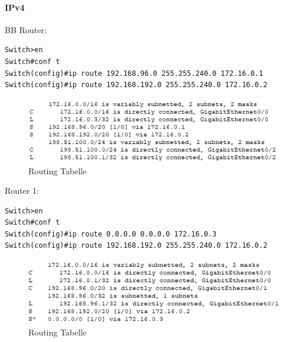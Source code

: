 \paragraph{IPv4}
BB Router:
\begin{lstlisting}
Switch>en
Switch#conf t
Switch(config)#ip route 192.168.96.0 255.255.240.0 172.16.0.1
Switch(config)#ip route 192.168.192.0 255.255.240.0 172.16.0.2 
\end{lstlisting}
\begin{figure}[!htb]
    \centering
    \includegraphics[width=\textwidth,height=.75\textwidth,keepaspectratio]{./routing/ipv4_bb.png}
    \caption{Routing Tabelle}
\end{figure}

\noindent
Router 1:
\begin{lstlisting}
Switch>en
Switch#conf t
Switch(config)#ip route 0.0.0.0 0.0.0.0 172.16.0.3
Switch(config)#ip route 192.168.192.0 255.255.240.0 172.16.0.2 
\end{lstlisting}
\begin{figure}[!htb]
    \centering
    \includegraphics[width=\textwidth,height=.75\textwidth,keepaspectratio]{./routing/ipv4_1.png}
    \caption{Routing Tabelle}
\end{figure}

